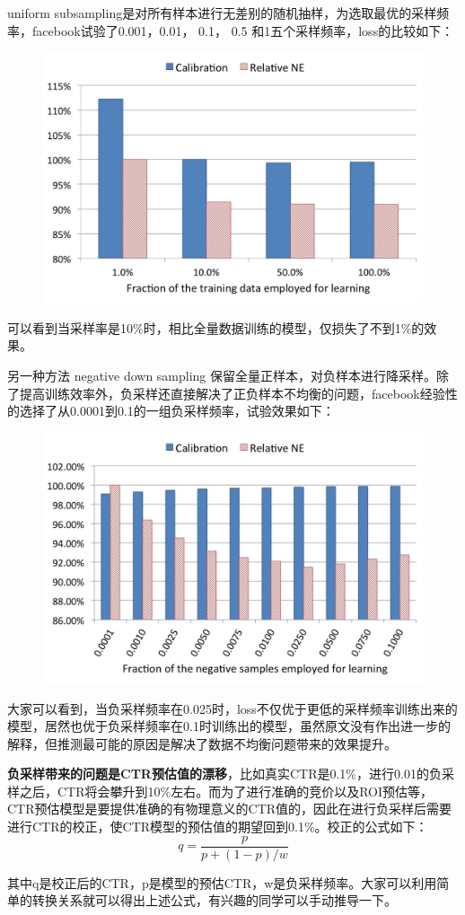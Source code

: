 \documentclass[12pt]{article}
\begin{document}
uniform subsampling是对所有样本进行无差别的随机抽样，为选取最优的采样频率，facebook试验了0.001，0.01， 0.1， 0.5 和1五个采样频率，loss的比较如下：
\begin{figure}[H]
    \centering
    \includegraphics[width=.6\textwidth]{fig/Facebook_DownSample.jpg}
\end{figure}
可以看到当采样率是10\%时，相比全量数据训练的模型，仅损失了不到1\%的效果。

另一种方法 negative down sampling 保留全量正样本，对负样本进行降采样。除了提高训练效率外，负采样还直接解决了正负样本不均衡的问题，facebook经验性的选择了从0.0001到0.1的一组负采样频率，试验效果如下：
\begin{figure}[H]
    \centering
    \includegraphics[width=.6\textwidth]{fig/Facebook_Negative_Down_Sampling.jpg}
\end{figure}
大家可以看到，当负采样频率在0.025时，loss不仅优于更低的采样频率训练出来的模型，居然也优于负采样频率在0.1时训练出的模型，虽然原文没有作出进一步的解释，但推测最可能的原因是解决了数据不均衡问题带来的效果提升。

\textbf{负采样带来的问题是CTR预估值的漂移}，比如真实CTR是0.1\%，进行0.01的负采样之后，CTR将会攀升到10\%左右。而为了进行准确的竞价以及ROI预估等，CTR预估模型是要提供准确的有物理意义的CTR值的，因此在进行负采样后需要进行CTR的校正，使CTR模型的预估值的期望回到0.1\%。校正的公式如下：
$$
q = \frac{p}{p + (1-p)/w}
$$

其中q是校正后的CTR，p是模型的预估CTR，w是负采样频率。大家可以利用简单的转换关系就可以得出上述公式，有兴趣的同学可以手动推导一下。
\end{document}

